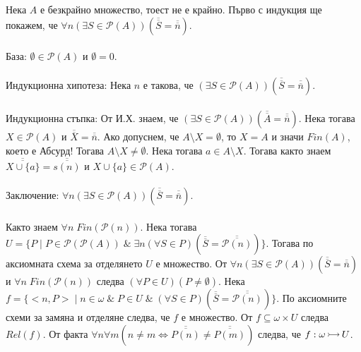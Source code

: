 \documentclass[12pt]{article}
\newcommand{\injection}[0]{\,\mathlarger{\mathlarger{\rightarrowtail}}\,}
\begin{document}
Нека \(A\) е безкрайно множество, тоест не е крайно.
Първо с индукция ще покажем, че \(\forall n (\exists S \in \mathcal{P}(A))(\overline{\overline{S}} = \overline{\overline{n}})\).
\\
\vspace{1mm}
\\
База: \(\emptyset \in \mathcal{P}(A)\) и \(\emptyset = 0\).
\\
\vspace{1mm}
\\
Индукционна хипотеза: Нека \(n\) е такова, че \((\exists S \in \mathcal{P}(A))(\overline{\overline{S}} = \overline{\overline{n}})\).
\\
\vspace{1mm}
\\
Индукционна стъпка: От И.Х. знаем, че \((\exists S \in \mathcal{P}(A))(\overline{\overline{A}} = \overline{\overline{n}})\).
Нека тогава \(X \in \mathcal{P}(A)\) и \(\overline{\overline{X}} = \overline{\overline{n}}\). Ако допуснем, че \(A \setminus X = \emptyset\),
то \(X = A\) и значи \(Fin(A)\), което е Абсурд!
Тогава \(A \setminus X \neq \emptyset\).
Нека тогава \(a \in A \setminus X\).
Тогава както знаем \(\overline{\overline{X \cup \{a\}}} = \overline{\overline{s(n)}}\)
и \(X \cup \{a\} \in \mathcal{P}(A)\).
\\
\vspace{1mm}
\\
Заключение: \(\forall n (\exists S \in \mathcal{P}(A))(\overline{\overline{S}} = \overline{\overline{n}})\).
\\
\vspace{1mm}
\\
Както знаем \(\forall n \; Fin(\mathcal{P}(n))\).
Нека тогава \\
\(U = \{P \; | \; P \in \mathcal{P}(\mathcal{P}(A)) \; \& \; \exists n (\forall S \in P)(\overline{\overline{S}} = \overline{\overline{\mathcal{P}(n)}}) \}\).
Тогава по аксиомната схема за отделянето \(U\) е множество.
От \(\forall n (\exists S \in \mathcal{P}(A))(\overline{\overline{S}} = \overline{\overline{n}})\) и \(\forall n \; Fin(\mathcal{P}(n))\) 
следва \((\forall P \in U)(P \neq \emptyset)\).
Нека \\
\(f = \{<n, P> \; | \; n \in \omega \; \& \; P \in U \; \& \; (\forall S \in P)(\overline{\overline{S}} = \overline{\overline{\mathcal{P}(n)}})\}\).
По аксиомните схеми за замяна и отделяне следва, че \(f\) е множество.
От \(f \subseteq \omega \times U\) следва \(Rel(f)\).
От факта \(\forall n \forall m (n \neq m \iff \overline{\overline{P(n)}} \neq \overline{\overline{P(m)}})\) следва, че \(f : \omega \injection U\).
\end{document}
